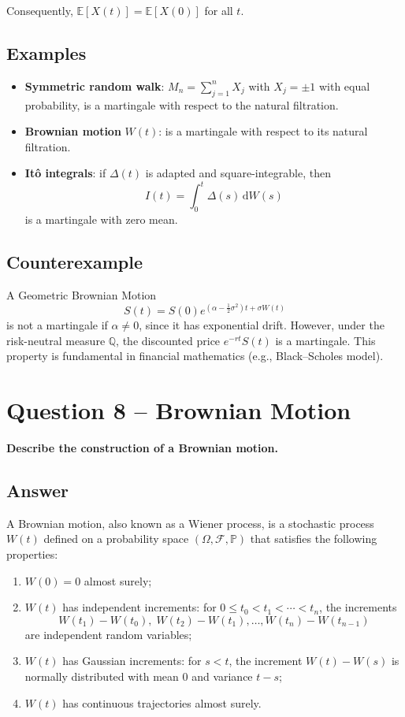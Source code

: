 \documentclass[12pt,a4paper]{book}
\theoremstyle{remark}
\newcommand{\PP}{\mathbb{P}}          %
\newcommand{\EE}{\mathbb{E}}          %
\newcommand{\QQ}{\mathbb{Q}}          %
\newcommand{\F}{\mathcal{F}}          %
\newcommand{\dd}{\mathrm{d}}
\begin{document}
Consequently, $\EE[X(t)] = \EE[X(0)]$ for all $t$.

\subsection*{Examples}
\begin{itemize}
    \item \textbf{Symmetric random walk}: $M_n = \sum_{j=1}^n X_j$ with $X_j = \pm 1$ with equal probability, is a martingale with respect to the natural filtration.
    \item \textbf{Brownian motion} $W(t)$: is a martingale with respect to its natural filtration.
    \item \textbf{It\^o integrals}: if $\Delta(t)$ is adapted and square-integrable, then 
    \[
    I(t) = \int_0^t \Delta(s)\,\dd W(s)
    \]
    is a martingale with zero mean.
\end{itemize}

\subsection*{Counterexample}
A Geometric Brownian Motion 
\[
S(t) = S(0) e^{(\alpha - \tfrac{1}{2}\sigma^2)t + \sigma W(t)}
\]
is not a martingale if $\alpha \neq 0$, since it has exponential drift. However, under the risk-neutral measure $\QQ$, the discounted price $e^{-rt}S(t)$ is a martingale. This property is fundamental in financial mathematics (e.g., Black--Scholes model).


\newpage
\section{Question 8 -- Brownian Motion}
\textbf{Describe the construction of a Brownian motion.}

\subsection*{Answer}
A Brownian motion, also known as a Wiener process, is a stochastic process $W(t)$ defined on a probability space $(\Omega, \F, \PP)$ that satisfies the following properties:

\begin{enumerate}[label=\roman*)]
    \item $W(0) = 0$ almost surely;
    \item $W(t)$ has independent increments: for $0 \leq t_0 < t_1 < \cdots < t_n$, the increments 
    \[
        W(t_1) - W(t_0), \; W(t_2) - W(t_1), \ldots, W(t_n) - W(t_{n-1})
    \]
    are independent random variables;
    \item $W(t)$ has Gaussian increments: for $s < t$, the increment $W(t) - W(s)$ is normally distributed with mean $0$ and variance $t-s$;
    \item $W(t)$ has continuous trajectories almost surely.
\end{enumerate}
\end{document}

